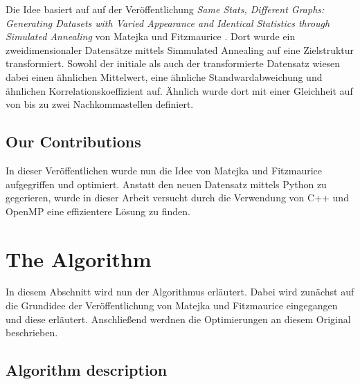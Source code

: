 \documentclass[sigconf]{acmart}
\begin{document}
Die Idee basiert auf auf der Veröffentlichung \textit{Same Stats, Different Graphs: Generating Datasets with Varied Appearance and Identical Statistics through Simulated Annealing} von Matejka und Fitzmaurice \cite{matejka2017same}. Dort wurde ein zweidimensionaler Datensätze mittels Simmulated Annealing auf eine Zielstruktur transformiert. Sowohl der initiale als auch der transformierte Datensatz wiesen dabei einen ähnlichen Mittelwert, eine ähnliche Standwardabweichung und ähnlichen Korrelationskoeffizient auf. Ähnlich wurde dort mit einer Gleichheit auf von bis zu zwei Nachkommastellen definiert.

\subsection{Our Contributions}

In dieser Veröffentlichen wurde nun die Idee von Matejka und Fitzmaurice\cite{matejka2017same} aufgegriffen und optimiert. Anstatt den neuen Datensatz mittels Python zu gegerieren, wurde in dieser Arbeit versucht durch die Verwendung von C++ und OpenMP eine effizientere Lösung zu finden.  




\section{The Algorithm}\label{sec:algo}

In diesem Abschnitt wird nun der Algorithmus erläutert. Dabei wird zunächst auf die Grundidee der Veröffentlichung von Matejka und Fitzmaurice\cite{matejka2017same} eingegangen und diese erläutert. Anschließend werdnen die Optimierungen an diesem Original beschrieben.

\subsection{Algorithm description}\label{sec:algo:desc}
\end{document}
